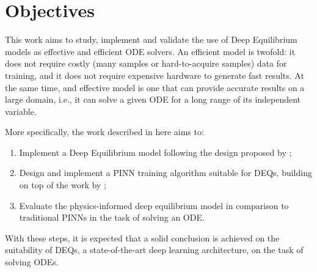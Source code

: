 
\section{Objectives}

This work aims to study, implement and validate the use of Deep Equilibrium models as effective and efficient \gls{ODE} solvers.
An efficient model is twofold: it does not require costly (many samples or hard-to-acquire samples) data for training, and it does not require expensive hardware to generate fast results.
At the same time, and effective model is one that can provide accurate results on a large domain, i.e., it can solve a given \gls{ODE} for a long range of its independent variable.

More specifically, the work described in here aims to:
\begin{enumerate}
    \item Implement a Deep Equilibrium model following the design proposed by \textcite{Bai2019};
    \item Design and implement a \gls{PINN} training algorithm suitable for \gls{DEQ}s, building on top of the work by \textcite{Raissi2019};
    \item Evaluate the physics-informed deep equilibrium model in comparison to traditional \gls{PINN}s in the task of solving an \gls{ODE}.
\end{enumerate}
With these steps, it is expected that a solid conclusion is achieved on the suitability of \gls{DEQ}s, a state-of-the-art deep learning architecture, on the task of solving \gls{ODE}s.




